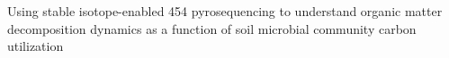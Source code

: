 Using stable isotope-enabled 454 pyrosequencing to understand organic matter decomposition dynamics as a function of soil microbial community carbon utilization